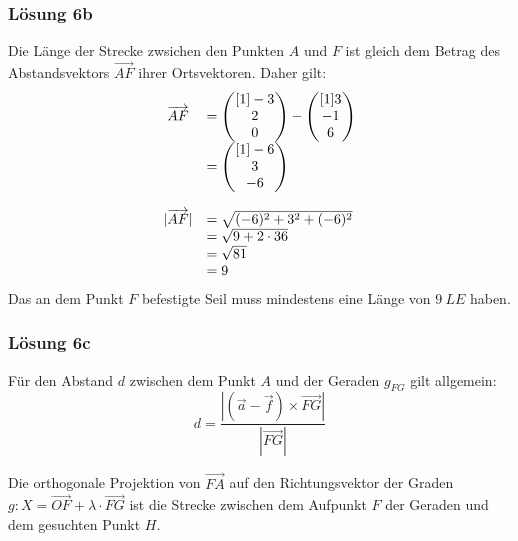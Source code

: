 \documentclass[main.tex]{subfiles}
\begin{document}
\subsubsection{Lösung 6b}
Die Länge der Strecke zwsichen den Punkten $A$ und $F$ ist gleich dem Betrag des Abstandsvektors $\overrightarrow{AF}$ ihrer Ortsvektoren. Daher gilt:
\begin{equation*}
    \begin{array}{ c l }
    \overrightarrow{AF} & =\begin{pmatrix}[1]
    -3\\
    2\\
    0
    \end{pmatrix} -\begin{pmatrix}[1]
    3\\
    -1\\
    6
    \end{pmatrix}\\
    & =\begin{pmatrix}[1]
    -6\\
    3\\
    -6
    \end{pmatrix}\\
    & \\
    | \overrightarrow{AF}|  & =\sqrt{( -6)^{2} +3^{2} +( -6)^{2}}\\
    & =\sqrt{9+2\cdotp 36}\\
    & =\sqrt{81}\\
    & =9
    \end{array}
\end{equation*}
Das an dem Punkt $F$ befestigte Seil muss mindestens eine Länge von $9\ LE$ haben.

\subsubsection{Lösung 6c}

Für den Abstand $d$ zwischen dem Punkt $A$ und der Geraden $g_{FG}$ gilt allgemein:
\begin{equation*}
    d=\frac{\left|(\vec{a} - \vec{f}) \times \overrightarrow{FG}\right|}{\left| \overrightarrow{FG} \right|}
\end{equation*}

Die orthogonale Projektion von $\vec{FA}$ auf den Richtungsvektor der Graden $g: X = \vec{OF} + \lambda \cdotp \vec{FG}$ ist die Strecke zwischen dem Aufpunkt $F$ der Geraden und dem gesuchten Punkt $H$.
\end{document}
